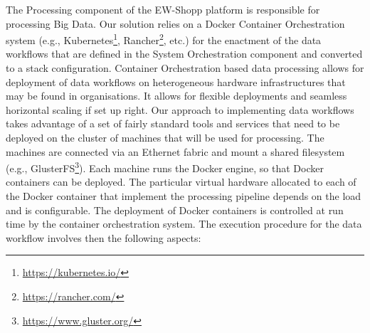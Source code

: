 The Processing component of the EW-Shopp platform is responsible for processing Big Data. Our solution relies on a Docker Container Orchestration system (e.g., Kubernetes\footnote{\url{https://kubernetes.io/}}, Rancher\footnote{\url{https://rancher.com/}}, etc.) for the enactment of the data workflows that are defined in the System Orchestration component and converted to a stack configuration. Container Orchestration based data processing allows for deployment of data workflows on heterogeneous hardware infrastructures that may be found in organisations. It allows for flexible deployments and seamless horizontal scaling if set up right. Our approach to implementing data workflows takes advantage of a set of fairly standard tools and services that need to be deployed on the cluster of machines that will be used for processing. The machines are connected via an Ethernet fabric and mount a shared filesystem (e.g., GlusterFS\footnote{\url{https://www.gluster.org/}}). Each machine runs the Docker engine, so that Docker containers can be deployed. The particular virtual hardware allocated to each of the Docker container that implement the processing pipeline depends on the load and is configurable. The deployment of Docker containers is controlled at run time by the container orchestration system. The execution procedure for the data workflow involves then the following aspects:
